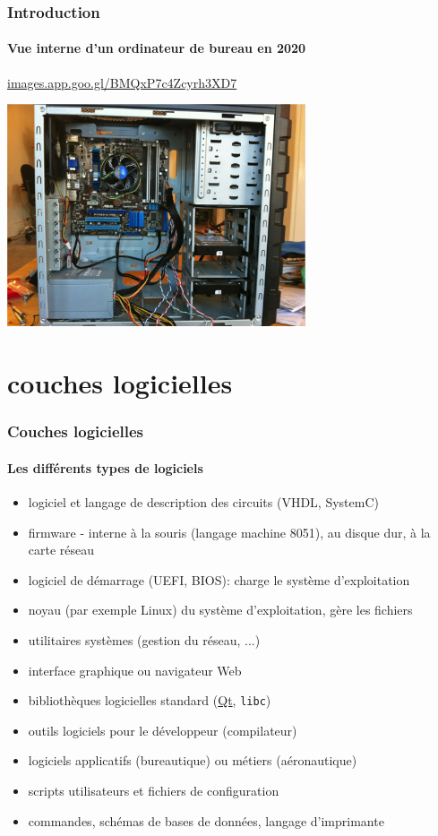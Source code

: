 \documentclass[xcolor=svgnames,final,smaller,a4]{beamer}
\begin{document}
\begin{frame}

  \frametitle{Introduction}
  \framesubtitle{Vue interne d'un ordinateur de bureau en 2020}

\href{https://images.app.goo.gl/BMQxP7c4Zcyrh3XD7}{images.app.goo.gl/BMQxP7c4Zcyrh3XD7}

\includegraphics[width=0.66\textwidth]{interieur-ordinateur.png}
\end{frame}


\section{couches logicielles}

\begin{frame}
  \frametitle{Couches logicielles}
  \framesubtitle{Les différents types de logiciels}

\begin{itemize}

\item logiciel et langage de description des circuits (VHDL, SystemC)
\item firmware - interne à la souris (langage machine 8051), au disque dur, à la carte réseau
\item logiciel de démarrage (UEFI, BIOS): charge le système d'exploitation
\item noyau (par exemple Linux) du système d'exploitation, gère les fichiers
\item utilitaires systèmes (gestion du réseau, ...)
\item interface graphique ou navigateur Web
\item bibliothèques logicielles standard (\href{http://qt.io}{Qt}, \texttt{libc})
\item outils logiciels pour le développeur (compilateur)
\item logiciels applicatifs (bureautique) ou métiers (aéronautique)
\item scripts utilisateurs et fichiers de configuration
\item commandes, schémas de bases de données, langage d'imprimante

\end{itemize}
\end{frame}
\end{document}
